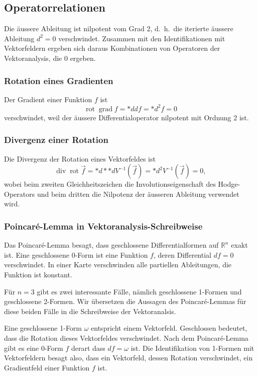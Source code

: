 %
%
\subsection{Operatorrelationen}
Die äussere Ableitung ist nilpotent vom Grad 2, d.~h.~die iterierte
äussere Ableitung $d^2=0$ verschwindet.
Zusammen mit den Identifikationen mit Vektorfeldern ergeben sich
daraus Kombinationen von Operatoren der Vektoranalysis, die
0 ergeben.

\subsubsection{Rotation eines Gradienten}
Der Gradient einer Funktion $f$ ist
\[
\operatorname{rot}\operatorname{grad}f
=
*{d}df
=
*d^2f
=
0
\]
verschwindet, weil der äussere Differentialoperator nilpotent mit
Ordnung $2$ ist.

\subsubsection{Divergenz einer Rotation}
Die Divergenz der Rotation eines Vektorfeldes ist
\[
\operatorname{div}\operatorname{rot} \vec{f}
=
*{d}{*}{*}d V^{-1}(\vec{f})
=
*d^2 V^{-1}(\vec{f})
=
0,
\]
wobei beim zweiten Gleichheitszeichen die Involutionseigenschaft
des Hodge-Operators und beim dritten die Nilpotenz der äusseren Ableitung
verwendet wird.

\subsubsection{Poincaré-Lemma in Vektoranalysis-Schreibweise}
Das Poincaré-Lemma besagt, dass geschlossene Differentialformen auf
$\mathbb{R}^n$ exakt ist.
Eine geschlossene 0-Form ist eine Funktion $f$, deren Differential
$df=0$ verschwindet.
In einer Karte verschwinden alle partiellen Ableitungen, die Funktion
ist konstant.

Für $n=3$ gibt es zwei interessante Fälle, nämlich geschlossene 1-Formen
und geschlossene 2-Formen.
Wir übersetzen die Aussagen des Poincaré-Lemmas für diese beiden
Fälle in die Schreibweise der Vektoranalsis.

Eine geschlossene 1-Form $\omega$ entspricht einem Vektorfeld.
Geschlossen bedeutet, dass die Rotation dieses Vektorfeldes verschwindet.
Nach dem Poincaré-Lemma gibt es eine 0-Form $f$ derart dass
$df=\omega$ ist.
Die Identifikation von 1-Formen mit Vektorfeldern besagt also, dass
ein Vektorfeld, dessen Rotation verschwindet, ein Gradientfeld
einer Funktion $f$ ist.

